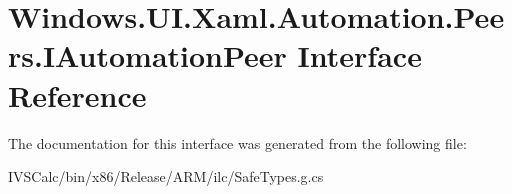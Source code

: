 \hypertarget{interface_windows_1_1_u_i_1_1_xaml_1_1_automation_1_1_peers_1_1_i_automation_peer}{}\section{Windows.\+U\+I.\+Xaml.\+Automation.\+Peers.\+I\+Automation\+Peer Interface Reference}
\label{interface_windows_1_1_u_i_1_1_xaml_1_1_automation_1_1_peers_1_1_i_automation_peer}


The documentation for this interface was generated from the following file\+:\begin{DoxyCompactItemize}
\item 
I\+V\+S\+Calc/bin/x86/\+Release/\+A\+R\+M/ilc/Safe\+Types.\+g.\+cs\end{DoxyCompactItemize}
